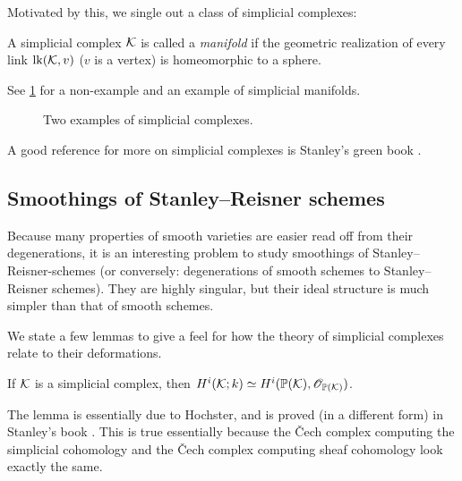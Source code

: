 Motivated by this, we single out a class of simplicial complexes:

\begin{definition}
A simplicial complex $\mathcal{K}$ is called a \emph{manifold} if the geometric realization of every link $\mathrm{lk}(\mathcal{K},v)$ ($v$ is a vertex) is homeomorphic to a sphere.
\end{definition}

See \cref{fig:simpmanifold} for a non-example and an example of simplicial manifolds.

\begin{figure}[t]
\centering 
\hspace*{\fill}%
 \hspace*{\fill}%
 \hspace*{\fill}%
\caption{Two examples of simplicial complexes.}
\label{fig:simpmanifold}
\end{figure}

A good reference for more on simplicial complexes is Stanley's green book \cite{stanley_green}.

\subsection{Smoothings of Stanley--Reisner schemes}

Because many properties of smooth varieties are easier read off from their degenerations, it is an interesting problem to study smoothings of Stanley--Reisner-schemes (or conversely: degenerations of smooth schemes to Stanley--Reisner schemes). They are highly singular, but their ideal structure is much simpler than that of smooth schemes.

We state a few lemmas to give a feel for how the theory of simplicial complexes relate to their deformations.

\begin{lemma}
\label{lemma:srcohom}
If $\mathcal{K}$ is a simplicial complex, then $H^i(\mathcal{K};k) \simeq H^i(\mathbb{P}(\mathcal{K}),\mathscr{O}_{\mathbb{P}(\mathcal{K})})$.
\end{lemma}
The lemma is essentially due to Hochster, and is proved (in a different form) in Stanley's book \cite{stanley_green}. This is true essentially because the \v{C}ech complex computing the simplicial cohomology and the \v{C}ech complex computing sheaf cohomology look exactly the same.

